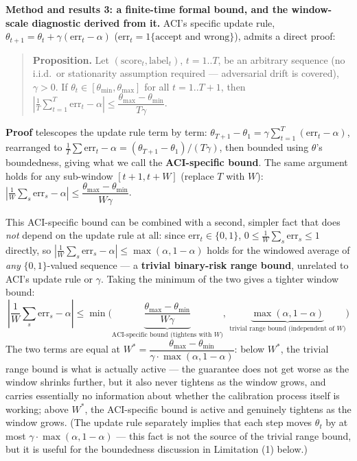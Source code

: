 \documentclass[11pt]{article}
\begin{document}
\textbf{Method and results 3: a finite-time formal bound, and the window-scale diagnostic derived from it.} ACI's specific update rule, $\theta_{t+1} = \theta_t + \gamma(\text{err}_t - \alpha)$ ($\text{err}_t = 1\{\text{accept and wrong}\}$), admits a direct proof:

\begin{quote}
\textbf{Proposition.} Let $(\text{score}_t, \text{label}_t)$, $t=1..T$, be an arbitrary sequence (no i.i.d.\ or stationarity assumption required --- adversarial drift is covered), $\gamma > 0$. If $\theta_t \in [\theta_{\min}, \theta_{\max}]$ for all $t=1..T+1$, then $\left| \frac{1}{T}\sum_{t=1}^T \text{err}_t - \alpha \right| \le \dfrac{\theta_{\max} - \theta_{\min}}{T\gamma}$.
\end{quote}

\textbf{Proof} telescopes the update rule term by term: $\theta_{T+1} - \theta_1 = \gamma\sum_{t=1}^T(\text{err}_t - \alpha)$, rearranged to $\frac{1}{T}\sum\text{err}_t - \alpha = (\theta_{T+1}-\theta_1)/(T\gamma)$, then bounded using $\theta$'s boundedness, giving what we call the \textbf{ACI-specific bound}. The same argument holds for any sub-window $[t+1, t+W]$ (replace $T$ with $W$): $\left|\frac{1}{W}\sum_{s}\text{err}_s - \alpha\right| \le \dfrac{\theta_{\max}-\theta_{\min}}{W\gamma}$.

This ACI-specific bound can be combined with a second, simpler fact that does \emph{not} depend on the update rule at all: since $\text{err}_t \in \{0,1\}$, $0 \le \frac{1}{W}\sum_s \text{err}_s \le 1$ directly, so $\left|\frac{1}{W}\sum_s \text{err}_s - \alpha\right| \le \max(\alpha, 1-\alpha)$ holds for the windowed average of \emph{any} $\{0,1\}$-valued sequence --- a \textbf{trivial binary-risk range bound}, unrelated to ACI's update rule or $\gamma$. Taking the minimum of the two gives a tighter window bound:
$$
\left|\frac{1}{W}\sum_s \text{err}_s - \alpha\right| \le \min\Bigg(\underbrace{\frac{\theta_{\max}-\theta_{\min}}{W\gamma}}_{\text{ACI-specific bound (tightens with } W\text{)}},\ \underbrace{\max(\alpha, 1-\alpha)}_{\text{trivial range bound (independent of } W\text{)}}\Bigg)
$$
The two terms are equal at $W^* = \dfrac{\theta_{\max}-\theta_{\min}}{\gamma \cdot \max(\alpha, 1-\alpha)}$: below $W^*$, the trivial range bound is what is actually active --- the guarantee does not get worse as the window shrinks further, but it also never tightens as the window grows, and carries essentially no information about whether the calibration process itself is working; above $W^*$, the ACI-specific bound is active and genuinely tightens as the window grows. (The update rule separately implies that each step moves $\theta_t$ by at most $\gamma \cdot \max(\alpha, 1-\alpha)$ --- this fact is not the source of the trivial range bound, but it is useful for the boundedness discussion in Limitation (1) below.)
\end{document}
